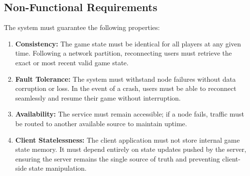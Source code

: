 \documentclass{scrartcl}
\begin{document}
\subsection*{Non-Functional Requirements}
The system must guarantee the following properties:

\begin{enumerate}[label=NF\arabic*.,ref=NF\arabic*]
    \item \label{nf:consistency} \textbf{Consistency:} The game state must be identical for all players at any given time. Following a network partition, reconnecting users must retrieve the exact or most recent valid game state.
    \item \label{nf:fault-tolerance} \textbf{Fault Tolerance:} The system must withstand node failures without data corruption or loss. In the event of a crash, users must be able to reconnect seamlessly and resume their game without interruption.
    \item \label{nf:availability} \textbf{Availability:} The service must remain accessible; if a node fails, traffic must be routed to another available source to maintain uptime.
    \item \label{nf:client-statelessness} \textbf{Client Statelessness:} The client application must not store internal game state memory. It must depend entirely on state updates pushed by the server, ensuring the server remains the single source of truth and preventing client-side state manipulation.
\end{enumerate}

\end{document}
